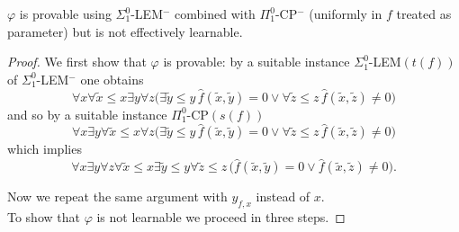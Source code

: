 \begin{prop}\label{p:nonLearnablePhi} $\varphi$  
is provable using {\rm $\Sigma^0_1$-LEM$^-$} combined with 
{\rm $\Pi^0_1$-CP$^-$} (uniformly in $f$ treated as parameter) but  
is not effectively learnable.
\end{prop}
\begin{proof}
We first show that $\varphi$ is provable: by a suitable instance 
$\Sigma^0_1$-LEM$(t(f))$ of $\Sigma^0_1$-LEM$^-$ one obtains 
\[ \forall x\forall \tilde{x}\le x\exists y\forall z \big( 
\exists \tilde{y}\le y\,\widehat{f}(\tilde{x},\tilde{y})=0 \vee \forall 
\tilde{z}\le z 
\,\widehat{f}(\tilde{x},\tilde{z})\not=0\big) \] 
and so by a suitable instance $\Pi^0_1$-CP$(s(f))$ 
\[ \forall x\exists y \forall \tilde{x}\le x \forall z 
\big( 
\exists \tilde{y}\le y\,\widehat{f}(\tilde{x},\tilde{y})=0 \vee \forall 
\tilde{z}\le z 
\,\widehat{f}(\tilde{x},\tilde{z})\not=0\big) \] which implies  
\[ \forall x\exists y \forall z\forall \tilde{x}\le x \exists \tilde{y}\le y
\forall \tilde{z}\le z\, 
\big( \widehat{f}(\tilde{x},\tilde{y})=0 \vee 
\widehat{f}(\tilde{x},\tilde{z})\not=0\big). \]

Now we repeat the same argument with $y_{f,x}$ instead of $x.$
\\[1mm] 
To show that $\varphi$ is not learnable we proceed in three steps.

\end{proof}
